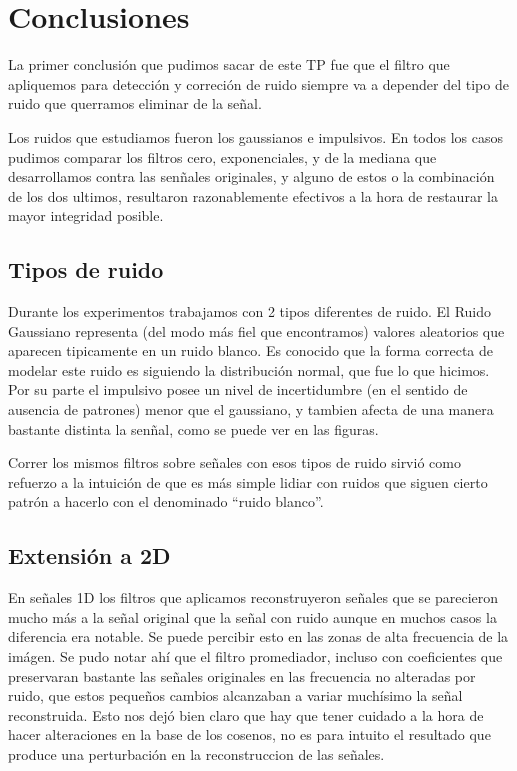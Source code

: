 \section{Conclusiones}

La primer conclusi\'on que pudimos sacar de este TP fue que el filtro que apliquemos para detecci\'on y correci\'on
de ruido siempre va a depender del tipo de ruido que querramos eliminar de la se\~nal.

Los ruidos que estudiamos fueron los gaussianos  e impulsivos. En todos los casos pudimos comparar los filtros
cero, exponenciales, y de la mediana que desarrollamos contra las sen\~nales originales, y alguno de estos o
la combinaci\'on de los dos ultimos, resultaron razonablemente efectivos a la hora de restaurar la mayor integridad posible.

\subsection{Tipos de ruido}

Durante los experimentos trabajamos con 2 tipos diferentes de ruido. 
El  Ruido Gaussiano representa (del modo m\'as fiel que encontramos) valores aleatorios  que aparecen tipicamente en
un ruido blanco. Es conocido que la forma correcta de modelar este ruido es siguiendo la distribuci\'on normal,
que fue lo que hicimos.
Por su parte el impulsivo posee un nivel de incertidumbre (en el sentido de ausencia de patrones)
menor que el gaussiano, y tambien afecta de una manera bastante distinta la sen\~nal, como se puede ver en las
figuras.

Correr los mismos filtros sobre se\~nales con esos tipos de ruido sirvi\'o como
refuerzo a la intuici\'on de que es m\'as simple lidiar con ruidos que siguen
cierto patr\'on a hacerlo con el denominado ``ruido blanco''.

\subsection{Extensi\'on a 2D}

En se\~nales 1D los filtros que aplicamos reconstruyeron se\~nales que se parecieron mucho m\'as a la se\~nal
original que la se\~nal con ruido aunque en muchos casos la diferencia era notable. Se puede percibir esto en las zonas
de alta frecuencia de la im\'agen. 
Se pudo notar ah\'i que el filtro promediador, incluso con coeficientes que preservaran
bastante las se\~nales originales en las frecuencia no alteradas por ruido, que estos peque\~nos cambios alcanzaban a
variar much\'isimo la se\~nal reconstruida. Esto nos dej\'o bien claro que hay que tener cuidado a la hora de hacer alteraciones
en la base de los cosenos, no es para intuito el resultado que produce una perturbaci\'on en la reconstruccion de las se\~nales.

